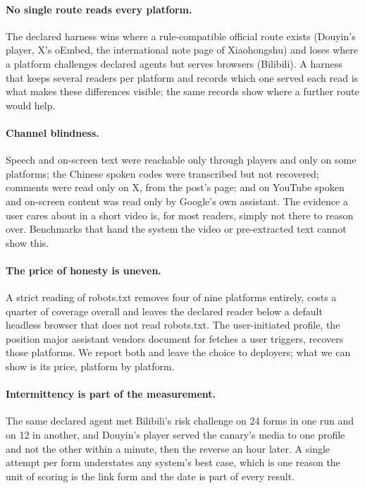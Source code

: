 \paragraph{No single route reads every platform.}
The declared harness wins where a rule-compatible official route exists (Douyin's player, X's oEmbed, the
international note page of Xiaohongshu) and loses where a platform challenges declared agents but serves browsers
(Bilibili). A harness that keeps several readers per platform and records which one served each read is what makes
these differences visible; the same records show where a further route would help.

\paragraph{Channel blindness.}
Speech and on-screen text were reachable only through players and only on some platforms; the Chinese spoken codes
were transcribed but not recovered; comments were read only on X, from the post's page; and on YouTube spoken and
on-screen content was read only by Google's own assistant. The evidence a user cares about in a short video is, for
most readers, simply not there to reason over. Benchmarks that hand the system the video or pre-extracted text cannot
show this.

\paragraph{The price of honesty is uneven.}
A strict reading of robots.txt removes four of nine platforms entirely, costs a quarter of coverage overall and leaves
the declared reader below a default headless browser that does not read robots.txt. The user-initiated profile, the
position major assistant vendors document for fetches a user triggers, recovers those platforms. We report both and
leave the choice to deployers; what we can show is its price, platform by platform.

\paragraph{Intermittency is part of the measurement.}
The same declared agent met Bilibili's risk challenge on 24 forms in one run and on 12 in another, and Douyin's player
served the canary's media to one profile and not the other within a minute, then the reverse an hour later. A single
attempt per form understates any system's best case, which is one reason the unit of scoring is the link form and the
date is part of every result.

